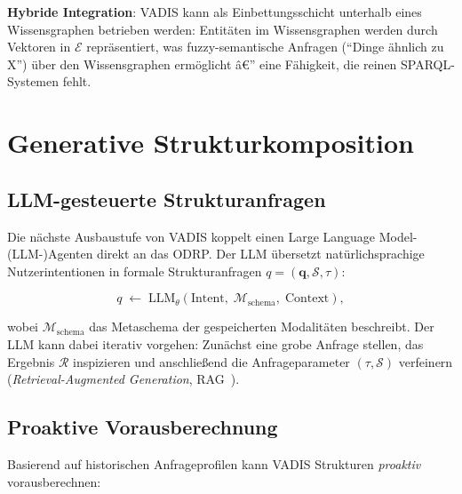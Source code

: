 ﻿\documentclass[12pt,a4paper]{article}
\begin{document}
\textbf{Hybride Integration}: VADIS kann als Einbettungsschicht
unterhalb eines Wissensgraphen betrieben werden: Entitäten im
Wissensgraphen werden durch Vektoren in $\mathcal{E}$ repräsentiert,
was fuzzy-semantische Anfragen (``Dinge ähnlich zu X'')
über den Wissensgraphen ermöglicht â€” eine Fähigkeit, die reinen
SPARQL-Systemen fehlt.

\section{Generative Strukturkomposition}
\label{sec:generativ}

\subsection{LLM-gesteuerte Strukturanfragen}

Die nächste Ausbaustufe von VADIS koppelt einen
Large Language Model-(LLM-)Agenten direkt an das ODRP.
Der LLM übersetzt natürlichsprachige Nutzerintentionen in
formale Strukturanfragen $q = (\mathbf{q}, \mathcal{S}, \tau)$:

\begin{equation}
  q \;\gets\; \text{LLM}_\theta\!\left(
    \text{Intent},\; \mathcal{M}_{\text{schema}},\; \text{Context}
  \right),
\end{equation}

wobei $\mathcal{M}_{\text{schema}}$ das Metaschema der gespeicherten
Modalitäten beschreibt. Der LLM kann dabei iterativ vorgehen:
Zunächst eine grobe Anfrage stellen, das Ergebnis $\mathcal{R}$
inspizieren und anschließend die Anfrageparameter $(\tau, \mathcal{S})$
verfeinern (\emph{Retrieval-Augmented Generation}, RAG~\cite{lewis2020rag}).

\subsection{Proaktive Vorausberechnung}

Basierend auf historischen Anfrageprofilen kann VADIS
Strukturen \emph{proaktiv} vorausberechnen:
\end{document}
